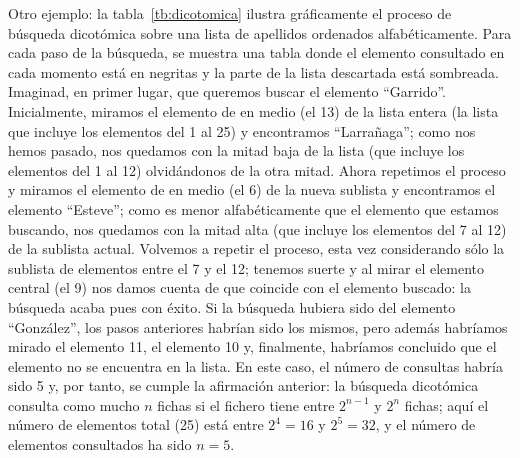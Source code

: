 Otro ejemplo: la tabla~\ref{tb:dicotomica} ilustra gráficamente el proceso de búsqueda dicotómica sobre una lista de apellidos ordenados alfabéticamente. Para cada paso de la búsqueda, se muestra una tabla donde el elemento consultado en cada momento está en negritas y la parte de la lista descartada está sombreada. Imaginad, en primer lugar, que queremos buscar el elemento ``Garrido''. Inicialmente, miramos el elemento de en medio (el 13) de la lista entera (la lista que incluye los elementos del 1 al 25) y encontramos ``Larrañaga''; como nos hemos pasado, nos quedamos con la mitad baja de la lista (que incluye los elementos del 1 al 12) olvidándonos de la otra mitad. Ahora repetimos el proceso y miramos el elemento de en medio (el 6) de la nueva sublista y encontramos el elemento ``Esteve''; como es menor alfabéticamente que el elemento que estamos buscando, nos quedamos con la mitad alta (que incluye los elementos del 7 al 12) de la sublista actual. Volvemos a repetir el proceso, esta vez considerando sólo la sublista de elementos entre el 7 y el 12; tenemos suerte y al mirar el elemento central (el 9) nos damos cuenta de que coincide con el elemento buscado: la búsqueda acaba pues con éxito. Si la búsqueda hubiera sido del elemento ``González'', los pasos anteriores habrían sido los mismos, pero además habríamos mirado el elemento 11, el elemento 10 y, finalmente, habríamos concluido que el elemento no se encuentra en la lista. En este caso, el número de consultas habría sido 5 y, por tanto, se cumple la afirmación anterior: la búsqueda dicotómica consulta como mucho $n$ fichas si el fichero tiene entre $2^{n-1}$ y $2^n$ fichas; aquí el número de elementos total (25) está entre $2^4=16$ y $2^5=32$, y el número de elementos consultados ha sido $n=5$. 

